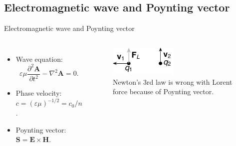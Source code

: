 \subsection{Electromagnetic wave and Poynting vector}

\begin{frame}{Electromagnetic wave and Poynting vector}
    \begin{columns}
    \vspace{-4mm}
    \begin{itemize}
        \item Wave equation: 
        \begin{equation*}
            \varepsilon \mu \frac{\partial^2 \mathbf{A}}{\partial t^2} - \nabla^2 \mathbf{A} = 0.
        \end{equation*}

        \item Phase velocity: 
        \( c = (\varepsilon \mu)^{-1/2} = c_0/n \).
        \item Poynting vector: 
        \( \mathbf{S} = \mathbf{E} \times \mathbf{H} \).
    \end{itemize}

    \begin{figure}
        \centering
        \includegraphics[width=0.5\textwidth]{Figures/Newton_3rd_law.pdf}
        \caption{Newton's 3rd law is wrong with Lorent force because of Poynting vector.}
        \label{fig:Newton_3rd_law}
    \end{figure}
    

\end{columns}
\end{frame}
